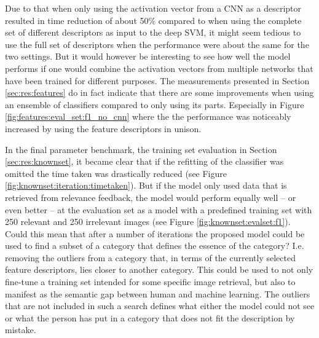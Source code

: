 Due to that when only using the activation vector from a CNN as a descriptor resulted in time reduction of about 50\% compared to when using the complete set of different descriptors as input to the deep SVM, it might seem tedious to use the full set of descriptors when the performance were about the same for the two settings. But it would however be interesting to see how well the model performs if one would combine the activation vectors from multiple networks that have been trained for different purposes. The measurements presented in Section \ref{sec:res:features} do in fact indicate that there are some improvements when using an ensemble of classifiers compared to only using its parts. Especially in Figure \ref{fig:features:eval_set:f1_no_cnn} where the the performance was noticeably increased by using the feature descriptors in unison. 


In the final parameter benchmark, the training set evaluation in Section \ref{sec:res:knownset}, it became clear that if the refitting of the classifier was omitted the time taken was drastically reduced (see Figure \ref{fig:knownset:iteration:timetaken}). But if the model only used data that is retrieved from relevance feedback, the model would perform equally well -- or even better -- at the evaluation set as a model with a predefined training set with 250 relevant and 250 irrelevant images (see Figure \ref{fig:knownset:evalset:f1}). Could this mean that after a number of iterations the proposed model could be used to find a subset of a category that defines the essence of the category? I.e. removing the outliers from a category that, in terms of the currently selected feature descriptors, lies closer to another category. This could be used to not only fine-tune a training set intended for some specific image retrieval, but also to manifest as the semantic gap between human and machine learning. The outliers that are not included in such a search defines what either the model could not see or what the person has put in a category that does not fit the description by mistake.


